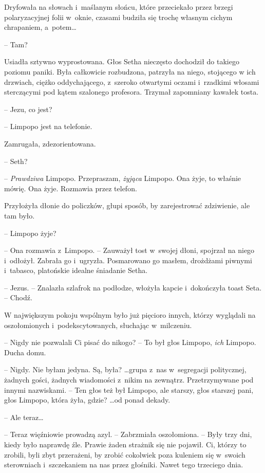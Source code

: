 \documentclass[oneside,polish,11pt,sfheadings]{mwbk}
\begin{document}
Dryfowała na słowach i~maślanym słońcu, które przeciekało przez brzegi
polaryzacyjnej folii w~oknie, czasami budziła się trochę własnym cichym
chrapaniem, a~potem\ldots 

-- Tam?

Usiadła sztywno wyprostowana. Głos Setha nieczęsto dochodził do takiego
poziomu paniki. Była całkowicie rozbudzona, patrzyła na niego, stojącego
w ich drzwiach, ciężko oddychającego, z~szeroko otwartymi oczami i~rzadkimi włosami sterczącymi pod kątem szalonego profesora. Trzymał
zapomniany kawałek tosta.

-- Jezu, co jest?

-- Limpopo jest na telefonie.

Zamrugała, zdezorientowana.

-- Seth?

-- \textit{Prawdziwa }Limpopo. Przepraszam, \textit{żyjąca} Limpopo. Ona
żyje, to właśnie mówię. Ona żyje. Rozmawia przez telefon.

Przyłożyła dłonie do policzków, głupi sposób, by zarejestrować
zdziwienie, ale tam było.

-- Limpopo żyje?

-- Ona rozmawia z~Limpopo. -- Zauważył tost w~swojej dłoni, spojrzał na
niego i~odłożył. Zabrała go i~ugryzła. Posmarowano go masłem, drożdżami
piwnymi i~tabasco, platońskie idealne śniadanie Setha.

-- Jezus. -- Znalazła szlafrok na podłodze, włożyła kapcie i~dokończyła
toast Seta. -- Chodź.

W największym pokoju wspólnym było już pięcioro innych, którzy wyglądali
na oszołomionych i~podekscytowanych, słuchając w~milczeniu.

-- Nigdy nie pozwalali Ci pisać do nikogo? -- To był głos Limpopo,
\textit{ich} Limpopo. Ducha domu.

-- Nigdy. Nie byłam jedyna. Są, była? \ldots  grupa z~nas w~segregacji
politycznej, żadnych gości, żadnych wiadomości z~nikim na zewnątrz.
Przetrzymywane pod innymi nazwiskami. -- Ten głos też był Limpopo, ale
starszy, głos starszej pani, głos Limpopo, która żyła, gdzie? \ldots  od
ponad dekady.

-- Ale teraz\ldots 

-- Teraz więźniowie prowadzą azyl. -- Zabrzmiała oszołomiona. -- Były trzy
dni, kiedy było naprawdę źle. Prawie żaden strażnik się nie pojawił. Ci,
którzy to zrobili, byli zbyt przerażeni, by zrobić cokolwiek poza
kuleniem się w~swoich sterowniach i~szczekaniem na nas przez głośniki.
Nawet tego trzeciego dnia.
\end{document}
